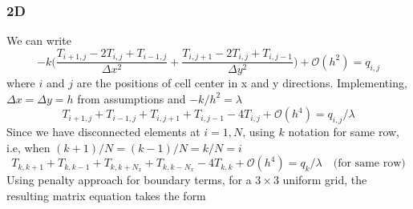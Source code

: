 \documentclass[12pt]{amsart}   %
\begin{document}
\subsubsection{2D}
We can write
\begin{equation}
    -k \Bigg(\frac{T_{i+1,j} -2T_{i,j} + T_{i-1,j}}{\Delta x^2}+\frac{T_{i,j+1} -2T_{i,j} + T_{i,j-1}}{\Delta y^2} \Bigg)+\mathcal{O}(h^2) = q_{i,j}
\end{equation}
where $i$ and $j$ are the positions of cell center in x and y directions. Implementing, $\Delta x = \Delta y = h$ from assumptions and $-k/h^2 = \lambda$
\begin{equation}
     T_{i+1,j} + T_{i-1,j}+T_{i,j+1} + T_{i,j-1} -4T_{i,j} +\mathcal{O}(h^4) = q_{i,j} / \lambda
\end{equation}
Since we have disconnected elements at $i=1,N$, using $k$ notation for same row, i.e, when $(k+1)/N = (k-1)/N = k/N = i$
\begin{equation}
     T_{k,k+1} + T_{k,k-1}+T_{k,k+N_x} + T_{k,k-N_x} -4T_{k,k} +\mathcal{O}(h^4) = q_{k} / \lambda \quad \text{(for same row)}
\end{equation}
Using penalty approach for boundary terms, for a $3\times3$ uniform grid, the resulting matrix equation takes the form\\
\end{document}
